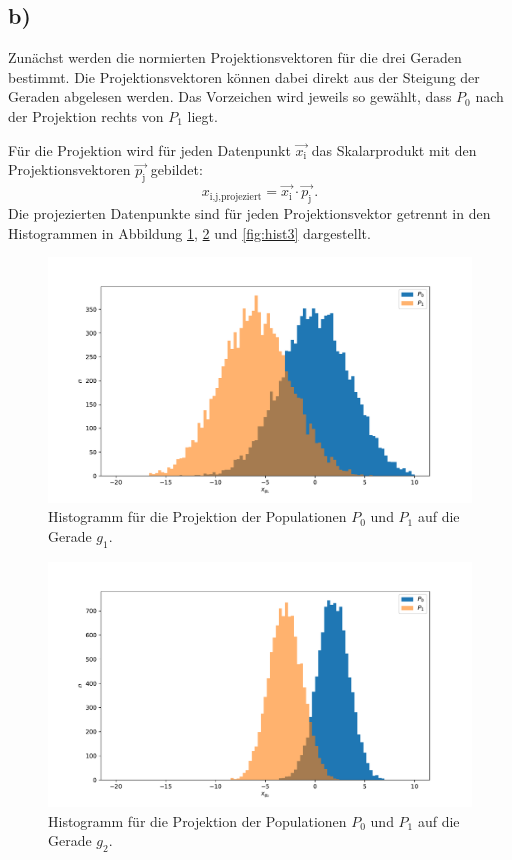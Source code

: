 \documentclass[a4paper, 11pt]{article}
\begin{document}
\subsection*{b)}
Zunächst werden die normierten Projektionsvektoren für die drei Geraden bestimmt.
Die Projektionsvektoren können dabei direkt aus der Steigung der Geraden abgelesen
werden. Das Vorzeichen wird jeweils so gewählt, dass $P_0$ nach der Projektion
rechts von $P_1$ liegt.

Für die Projektion wird für jeden Datenpunkt $\vec{x_\text{i}}$ das Skalarprodukt
mit den Projektionsvektoren $\vec{p_\text{j}}$ gebildet:
\begin{equation}
  x_\text{i,j,projeziert} = \vec{x_\text{i}} \cdot \vec{p_\text{j}}\,.
\end{equation}
Die projezierten Datenpunkte sind für jeden Projektionsvektor getrennt in den
Histogrammen in Abbildung \ref{fig:hist1}, \ref{fig:hist2} und \ref{fig:hist3}
dargestellt.
\begin{figure}
  \centering
  \includegraphics[width=\textwidth]{../A13/A13b_1}
  \caption{Histogramm für die Projektion der Populationen $P_0$ und $P_1$ auf
  die Gerade $g_1$.}
  \label{fig:hist1}
\end{figure}
\begin{figure}
  \centering
  \includegraphics[width=\textwidth]{../A13/A13b_2}
  \caption{Histogramm für die Projektion der Populationen $P_0$ und $P_1$ auf
  die Gerade $g_2$.}
  \label{fig:hist2}
\end{figure}
\end{document}
